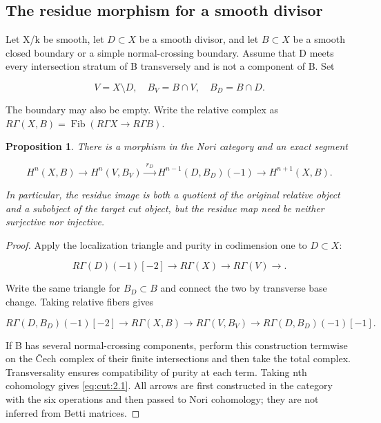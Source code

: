 \documentclass[11pt,a4paper,oneside]{article}
\theoremstyle{plain}
\newtheorem{proposition}[theorem]{Proposition}
\theoremstyle{definition}
\theoremstyle{remark}
\numberwithin{equation}{section}
\begin{document}
\subsection{The residue morphism for a smooth divisor}\label{sec:cut:2}

Let X/k be smooth, let \(D\subset X\) be a smooth divisor, and let \(B\subset X\) be a smooth closed boundary or a simple normal-crossing boundary. Assume that D meets every intersection stratum of B transversely and is not a component of B. Set

\begin{equation}
V=X\setminus D,\quad B_V=B\cap V,\quad B_D=B\cap D.
\end{equation}

The boundary may also be empty. Write the relative complex as \(R\Gamma(X,B)=\operatorname{Fib}(R\Gamma X\to R\Gamma B)\).

\begin{proposition}

\label{thm:cut:2.1} There is a morphism in the Nori category and an exact segment

\begin{equation}
H^n(X,B)\longrightarrow H^n(V,B_V)
 \xrightarrow{\ r_D\ }H^{n-1}(D,B_D)(-1)
 \longrightarrow H^{n+1}(X,B).                         \label{eq:cut:2.1}
\end{equation}

In particular, the residue image is both a quotient of the original relative object and a subobject of the target cut object, but the residue map need be neither surjective nor injective.

\end{proposition}

\begin{proof}

Apply the localization triangle and purity in codimension one to \(D\subset X\):

\begin{equation}
R\Gamma(D)(-1)[-2]\to R\Gamma(X)\to R\Gamma(V)\to.
\end{equation}

Write the same triangle for \(B_D\subset B\) and connect the two by transverse base change. Taking relative fibers gives

\begin{equation}
R\Gamma(D,B_D)(-1)[-2]\to R\Gamma(X,B)
 \to R\Gamma(V,B_V)\to R\Gamma(D,B_D)(-1)[-1].         \label{eq:cut:2.2}
\end{equation}

If B has several normal-crossing components, perform this construction termwise on the \v{C}ech complex of their finite intersections and then take the total complex. Transversality ensures compatibility of purity at each term. Taking nth cohomology gives \eqref{eq:cut:2.1}. All arrows are first constructed in the category with the six operations and then passed to Nori cohomology; they are not inferred from Betti matrices.

\end{proof}
\end{document}
